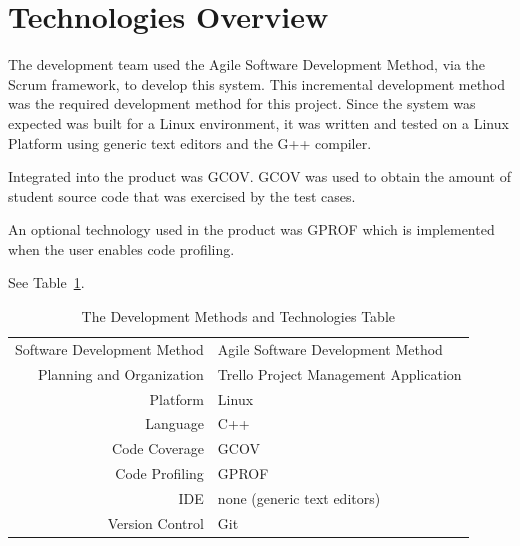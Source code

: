 \section{Technologies Overview}
The development team used the Agile Software Development Method, via the Scrum framework, to develop
this system.  This incremental development method was the required development method for this project.
Since the system was expected was built for a Linux environment, it was written and tested on a Linux Platform 
using generic text editors and the G++ compiler. 

Integrated into the product was GCOV. GCOV was used to obtain the amount of student source code that was exercised by the test cases.

An optional technology used in the product was GPROF which is implemented when the user enables code profiling. 


See Table~\ref{DevelopmentTable}.  
\begin{table}[tbh]
\begin{center}
\begin{tabular}{|r|l|}
  \hline
  Software Development Method & Agile Software Development Method \\
  Planning and Organization & Trello Project Management Application \\
  \hline \hline
  Platform & Linux \\
  Language & C++ \\ 
  Code Coverage & GCOV \\
  Code Profiling & GPROF \\ 
  IDE & none (generic text editors) \\
  Version Control & Git
  \\ \cline{2-2}
  
  \hline
\end{tabular}
\caption{The Development Methods and Technologies Table \label{DevelopmentTable}}
\end{center}
\end{table}

